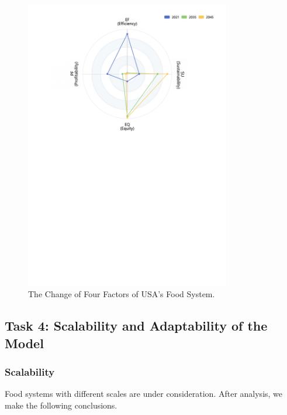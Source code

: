 \documentclass[12pt]{article}
\begin{document}
\begin{figure}[!htb]
\begin{minipage}[t]{0.48\textwidth}
        \includegraphics[width = 0.8\textwidth]{figure/radar/USA_radar.pdf}
        \caption{The Change of Four Factors of USA's Food System.\label{fig:USA_radar}}
    \end{minipage}
\end{figure}







\subsection{Task 4: Scalability and Adaptability of the Model}

\subsubsection{Scalability}

Food systems with different scales are under consideration. After analysis, we make the following conclusions.
\end{document}
